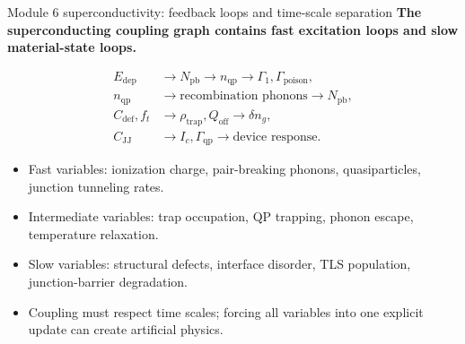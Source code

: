 \documentclass[aspectratio=169,10pt]{beamer}
\begin{document}
\begin{frame}{Module 6 superconductivity: feedback loops and time-scale separation}
\footnotesize
\textbf{The superconducting coupling graph contains fast excitation loops and slow material-state loops.}

\vspace{-0.2em}
\begin{align*}
E_{\mathrm{dep}}&\rightarrow N_{\mathrm{pb}}\rightarrow n_{\mathrm{qp}}\rightarrow \Gamma_1,\Gamma_{\mathrm{poison}},\\[-0.05em]
n_{\mathrm{qp}}&\rightarrow \text{recombination phonons}\rightarrow N_{\mathrm{pb}},\\[-0.05em]
C_{\mathrm{def}},f_t&\rightarrow \rho_{\mathrm{trap}},Q_{\mathrm{off}}\rightarrow \delta n_g,\\[-0.05em]
C_{\mathrm{JJ}}&\rightarrow I_c,\Gamma_{\mathrm{qp}}\rightarrow \text{device response}.
\end{align*}

\vspace{-0.2em}
\begin{itemize}
    \item Fast variables: ionization charge, pair-breaking phonons, quasiparticles, junction tunneling rates.
    \item Intermediate variables: trap occupation, QP trapping, phonon escape, temperature relaxation.
    \item Slow variables: structural defects, interface disorder, TLS population, junction-barrier degradation.
    \item Coupling must respect time scales; forcing all variables into one explicit update can create artificial physics.
\end{itemize}
\end{frame}
\end{document}
